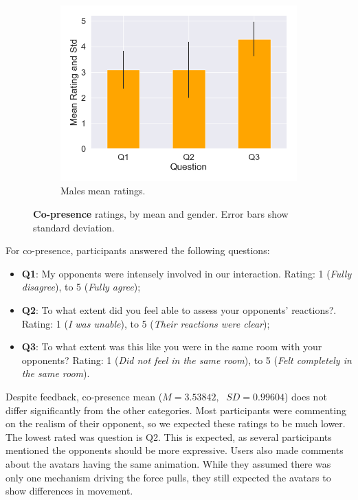 \begin{figure}[H]
 \begin{subfigure}[b]{\textwidth}
 \centering
 \includegraphics[scale=0.5]{Files/Plots/copresence_mean_m.png}
 \caption{Males mean ratings.}
 \label{fig:copresMale}
 \end{subfigure}
 \hspace{20mm}
 \caption{\textbf{Co-presence} ratings, by mean and gender. Error bars show standard deviation.}
\label{fig:coAll}
\end{figure}
For co-presence, participants answered the following questions:
\begin{itemize}
\itemsep0em
    \item \textbf{Q1}: My opponents were intensely involved in our interaction. Rating: 1 (\textit{Fully disagree}), to 5 (\textit{Fully agree});
    \item \textbf{Q2}: To what extent did you feel able to assess your opponents’ reactions?. Rating: 1 (\textit{I was unable}), to 5 (\textit{Their reactions were clear});
    \item \textbf{Q3}: To what extent was this like you were in the same room with your opponents? Rating: 1 (\textit{Did not feel in the same room}), to 5 (\textit{Felt completely in the same room}).
\end{itemize}

Despite feedback, co-presence mean ($M=3.53842,\;$ $ SD=0.99604 $) does not differ significantly from the other categories. Most participants were commenting on the realism of their opponent, so we expected these ratings to be much lower. The lowest rated was question is Q2. This is expected, as several participants mentioned the opponents should be more expressive. Users also made comments about the avatars having the same animation. While they assumed there was only one mechanism driving the force pulls, they still expected the avatars to show differences in movement.


